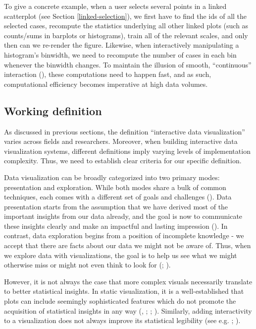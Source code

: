 \documentclass[
  openany]{book}
\theoremstyle{definition}
\theoremstyle{definition}
\theoremstyle{definition}
\theoremstyle{definition}
\theoremstyle{remark}
\begin{document}
To give a concrete example, when a user selects several points in a linked scatterplot (see Section \ref{linked-selection}), we first have to find the ids of all the selected cases, recompute the statistics underlying all other linked plots (such as counts/sums in barplots or histograms), train all of the relevant scales, and only then can we re-render the figure. Likewise, when interactively manipulating a histogram's binwidth, we need to recompute the number of cases in each bin whenever the binwidth changes. To maintain the illusion of smooth, ``continuous'' interaction (), these computations need to happen fast, and as such, computational efficiency becomes imperative at high data volumes.

\subsection{Working definition}\label{working-definition}

As discussed in previous sections, the definition ``interactive data visualization'' varies across fields and researchers. Moreover, when building interactive data visualization systems, different definitions imply varying levels of implementation complexity. Thus, we need to establish clear criteria for our specific definition.

Data visualization can be broadly categorized into two primary modes: presentation and exploration. While both modes share a bulk of common techniques, each comes with a different set of goals and challenges (). Data presentation starts from the assumption that we have derived most of the important insights from our data already, and the goal is now to communicate these insights clearly and make an impactful and lasting impression (). In contrast, data exploration begins from a position of incomplete knowledge - we accept that there are facts about our data we might not be aware of. Thus, when we explore data with visualizations, the goal is to help us see what we might otherwise miss or might not even think to look for (; ).

However, it is not always the case that more complex visuals necessarily translate to better statistical insights. In static visualization, it is a well-established that plots can include seemingly sophisticated features which do not promote the acquisition of statistical insights in any way (, ; ; ). Similarly, adding interactivity to a visualization does not always improve its statistical legibility (see e.g. ; ).
\end{document}
